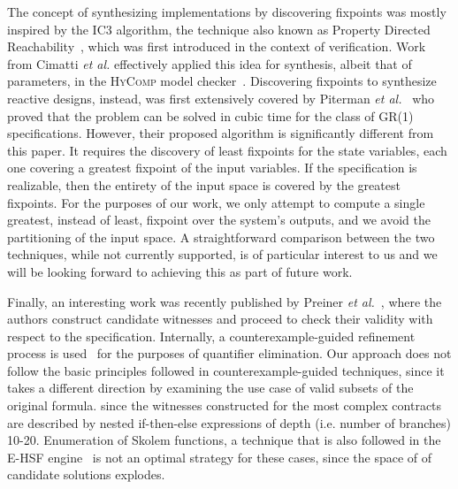 The concept of synthesizing implementations by discovering fixpoints was mostly
inspired by the IC3 algorithm, the technique also known as Property Directed
Reachability~\cite{bradley2011sat,een2011efficient}, which was first introduced
in the context of verification. Work from Cimatti \textit{et al.} effectively
applied this idea for synthesis, albeit that of parameters, in the
\textsc{HyComp} model checker~\cite{DBLP:conf/fmcad/CimattiGMT13, cimatti2015hycomp}.
Discovering fixpoints to synthesize reactive designs, instead, was first
extensively covered by Piterman \textit{et al.}~\cite{piterman2006synthesis}
who proved that the problem can be solved in cubic time for the class of GR(1) specifications.
However, their proposed algorithm is significantly different from this paper. It
requires the discovery of least fixpoints for the state variables,
each one covering a greatest fixpoint of the input variables. If the specification
is realizable, then the entirety of the input space is covered by the greatest fixpoints. For the purposes of our work, we only attempt to compute a single greatest, instead of least, fixpoint over the system's outputs, and we avoid the partitioning of the input space. A straightforward comparison between the two techniques, while not currently
supported, is of particular interest to us and we will be looking forward to
achieving this as part of future work.

Finally, an interesting work was recently published by Preiner \textit{et
al.}~\cite{preiner2017counterexample}, where the authors construct candidate
witnesses and proceed to check their validity with respect to the specification.
Internally, a counterexample-guided refinement process is
used~\cite{reynolds2015counterexample} for the purposes of quantifier
elimination.  Our approach does not follow the basic principles followed in counterexample-guided techniques, since it takes a different direction by
examining the use case of valid subsets of the original formula.
since the witnesses constructed for the most complex contracts are described by
nested if-then-else expressions of depth (i.e. number of branches) 10-20.
Enumeration of Skolem functions, a technique that is also followed in the E-HSF
engine~\cite{beyene2014constraint} is not an optimal strategy for these cases,
since the space of of candidate solutions explodes.

